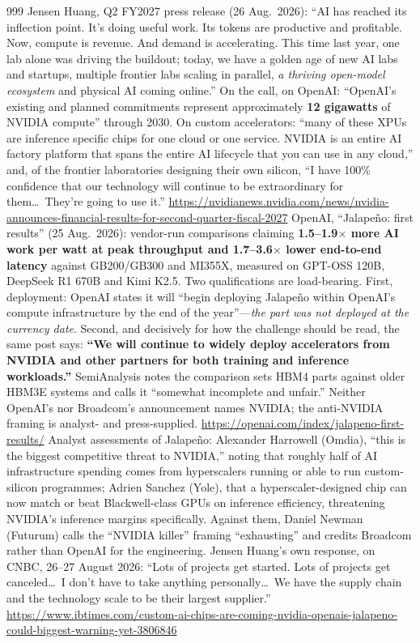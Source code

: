 \begin{thebibliography}{999}
 Jensen Huang, Q2 FY2027 press release (26 Aug.\ 2026): ``AI has reached its inflection point. It's doing useful work. Its tokens are productive and profitable. Now, compute is revenue. And demand is accelerating. This time last year, one lab alone was driving the buildout; today, we have a golden age of new AI labs and startups, multiple frontier labs scaling in parallel, \emph{a thriving open-model ecosystem} and physical AI coming online.'' On the call, on OpenAI: ``OpenAI's existing and planned commitments represent approximately \textbf{12 gigawatts} of NVIDIA compute'' through 2030. On custom accelerators: ``many of these XPUs are inference specific chips for one cloud or one service. NVIDIA is an entire AI factory platform that spans the entire AI lifecycle that you can use in any cloud,'' and, of the frontier laboratories designing their own silicon, ``I have 100\% confidence that our technology will continue to be extraordinary for them\ldots\ They're going to use it.'' \url{https://nvidianews.nvidia.com/news/nvidia-announces-financial-results-for-second-quarter-fiscal-2027}
 OpenAI, ``Jalape\~no: first results'' (25 Aug.\ 2026): vendor-run comparisons claiming \textbf{1.5--1.9$\times$ more AI work per watt at peak throughput and 1.7--3.6$\times$ lower end-to-end latency} against GB200/GB300 and MI355X, measured on GPT-OSS 120B, DeepSeek R1 670B and Kimi K2.5. Two qualifications are load-bearing. First, deployment: OpenAI states it will ``begin deploying Jalape\~no within OpenAI's compute infrastructure by the end of the year''---\emph{the part was not deployed at the currency date}. Second, and decisively for how the challenge should be read, the same post says: \textbf{``We will continue to widely deploy accelerators from NVIDIA and other partners for both training and inference workloads.''} SemiAnalysis notes the comparison sets HBM4 parts against older HBM3E systems and calls it ``somewhat incomplete and unfair.'' Neither OpenAI's nor Broadcom's announcement names NVIDIA; the anti-NVIDIA framing is analyst- and press-supplied. \url{https://openai.com/index/jalapeno-first-results/}
 Analyst assessments of Jalape\~no: Alexander Harrowell (Omdia), ``this is the biggest competitive threat to NVIDIA,'' noting that roughly half of AI infrastructure spending comes from hyperscalers running or able to run custom-silicon programmes; Adrien Sanchez (Yole), that a hyperscaler-designed chip can now match or beat Blackwell-class GPUs on inference efficiency, threatening NVIDIA's inference margins specifically. Against them, Daniel Newman (Futurum) calls the ``NVIDIA killer'' framing ``exhausting'' and credits Broadcom rather than OpenAI for the engineering. Jensen Huang's own response, on CNBC, 26--27 August 2026: ``Lots of projects get started. Lots of projects get canceled\ldots\ I don't have to take anything personally\ldots\ We have the supply chain and the technology scale to be their largest supplier.'' \url{https://www.ibtimes.com/custom-ai-chips-are-coming-nvidia-openais-jalapeno-could-biggest-warning-yet-3806846}

\end{thebibliography}
